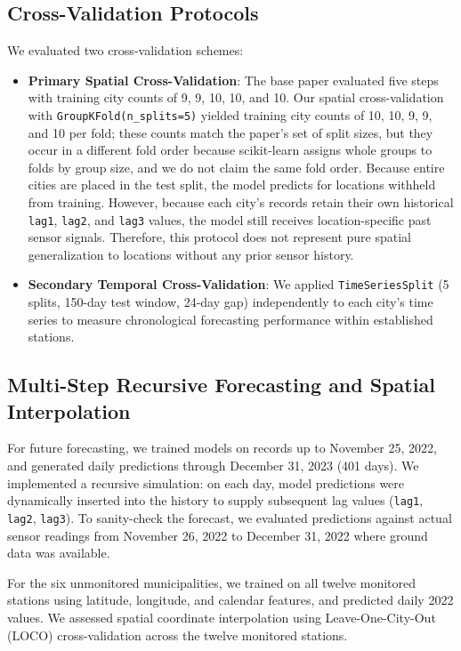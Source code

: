 \subsection{Cross-Validation Protocols}
We evaluated two cross-validation schemes:
\begin{itemize}
    \item \textbf{Primary Spatial Cross-Validation}: The base paper evaluated five steps with training city counts of 9, 9, 10, 10, and 10. Our spatial cross-validation with \texttt{GroupKFold(n\_splits=5)} yielded training city counts of 10, 10, 9, 9, and 10 per fold; these counts match the paper's set of split sizes, but they occur in a different fold order because scikit-learn assigns whole groups to folds by group size, and we do not claim the same fold order. Because entire cities are placed in the test split, the model predicts for locations withheld from training. However, because each city's records retain their own historical \texttt{lag1}, \texttt{lag2}, and \texttt{lag3} values, the model still receives location-specific past sensor signals. Therefore, this protocol does not represent pure spatial generalization to locations without any prior sensor history.
    \item \textbf{Secondary Temporal Cross-Validation}: We applied \texttt{TimeSeriesSplit} (5 splits, 150-day test window, 24-day gap) independently to each city's time series to measure chronological forecasting performance within established stations.
\end{itemize}

\subsection{Multi-Step Recursive Forecasting and Spatial Interpolation}
For future forecasting, we trained models on records up to November 25, 2022, and generated daily predictions through December 31, 2023 (401 days). We implemented a recursive simulation: on each day, model predictions were dynamically inserted into the history to supply subsequent lag values (\texttt{lag1}, \texttt{lag2}, \texttt{lag3}). To sanity-check the forecast, we evaluated predictions against actual sensor readings from November 26, 2022 to December 31, 2022 where ground data was available.

For the six unmonitored municipalities, we trained on all twelve monitored stations using latitude, longitude, and calendar features, and predicted daily 2022 values. We assessed spatial coordinate interpolation using Leave-One-City-Out (LOCO) cross-validation across the twelve monitored stations.


